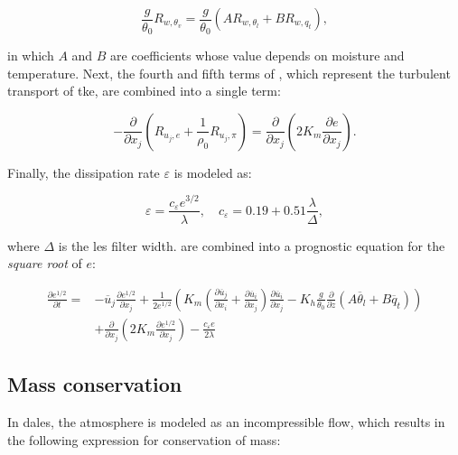 \begin{equation}
    \frac{g}{\theta_0} R_{w,\theta_v} = \frac{g}{\theta_0} \left( A R_{w,\theta_l} + B R_{w,q_t}\right),
    \label{eq:sfs_buoy}
\end{equation}

in which $A$ and $B$ are coefficients whose value depends on moisture and temperature. Next, the fourth and fifth terms of , which represent the turbulent transport of \acrshort{tke}, are combined into a single term:

\begin{equation}
    - \frac{\partial}{\partial x_j} \left( R_{u_j,e} + \frac{1}{\rho_0} R_{u_j,\pi} \right) = \frac{\partial}{\partial x_j} \left( 2 K_m \frac{\partial e}{\partial x_j} \right).
    \label{eq:sfs_turb}
\end{equation}

Finally, the dissipation rate $\varepsilon$ is modeled as:

\begin{equation}
    \varepsilon = \frac{c_{\varepsilon}e^{3/2}}{\lambda}, \quad c_\varepsilon = 0.19 + 0.51 \frac{\lambda}{\Delta},
    \label{eq:sfs_diss}
\end{equation}

where $\Delta$ is the \acrshort{les} filter width.  are combined into a prognostic equation for the \emph{square root} of $e$:

\begin{equation}
    \begin{split}
        \frac{\partial e^{1/2}}{\partial t} = &- \overline{u}_j \frac{\partial e^{1/2}}{\partial x_j} + \frac{1}{2e^{1/2}} \left( K_m \left( \frac{\partial \overline{u}_j}{\partial x_i} + \frac{\partial \overline{u}_i}{\partial x_j} \right) \frac{\partial \overline{u}_i}{\partial x_j} - K_h \frac{g}{\theta_0} \frac{\partial}{\partial z} \left( A \overline{\theta}_l + B \overline{q}_t\right) \right) \\ &+ \frac{\partial}{\partial x_j} \left( 2 K_m \frac{\partial e^{1/2}}{\partial x_j}\right) - \frac{c_{\varepsilon} e}{2 \lambda}
    \end{split}
    \end{equation}

\subsection{Mass conservation} \label{sec:dales_poisson}
In \acrshort{dales}, the atmosphere is modeled as an incompressible flow, which results in the following expression for conservation of mass:

